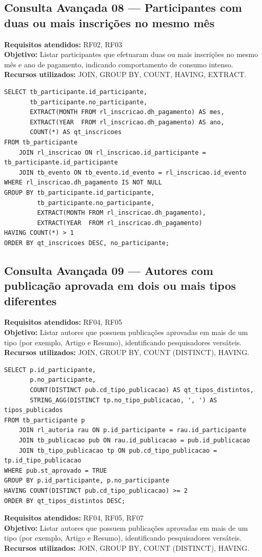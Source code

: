 \documentclass[12pt]{article}
\begin{document}
\subsection{Consulta Avançada 08 --- Participantes com duas ou mais inscrições no mesmo mês}
\textbf{Requisitos atendidos:} RF02, RF03 \\
\textbf{Objetivo:} Listar participantes que efetuaram duas ou mais inscrições no mesmo mês e ano de pagamento, indicando comportamento de consumo intenso. \\
\textbf{Recursos utilizados:} JOIN, GROUP BY, COUNT, HAVING, EXTRACT.
\begin{lstlisting}[caption={QA08 --- Participantes com duas ou mais inscrições no mesmo mês.}]
SELECT tb_participante.id_participante,
       tb_participante.no_participante,
       EXTRACT(MONTH FROM rl_inscricao.dh_pagamento) AS mes,
       EXTRACT(YEAR  FROM rl_inscricao.dh_pagamento) AS ano,
       COUNT(*) AS qt_inscricoes
FROM tb_participante
    JOIN rl_inscricao ON rl_inscricao.id_participante = tb_participante.id_participante
    JOIN tb_evento ON tb_evento.id_evento = rl_inscricao.id_evento
WHERE rl_inscricao.dh_pagamento IS NOT NULL
GROUP BY tb_participante.id_participante,
         tb_participante.no_participante,
         EXTRACT(MONTH FROM rl_inscricao.dh_pagamento),
         EXTRACT(YEAR  FROM rl_inscricao.dh_pagamento)
HAVING COUNT(*) > 1
ORDER BY qt_inscricoes DESC, no_participante;
\end{lstlisting}
\subsection{Consulta Avançada 09 --- Autores com publicação aprovada em dois ou mais tipos diferentes}
\textbf{Requisitos atendidos:} RF04, RF05 \\
\textbf{Objetivo:} Listar autores que possuem publicações aprovadas em mais de um tipo (por exemplo, Artigo e Resumo), identificando pesquisadores versáteis. \\
\textbf{Recursos utilizados:} JOIN, GROUP BY, COUNT (DISTINCT), HAVING.
\begin{lstlisting}[caption={QA09 --- Autores com publicação aprovada em dois ou mais tipos diferentes.}]
SELECT p.id_participante,
       p.no_participante,
       COUNT(DISTINCT pub.cd_tipo_publicacao) AS qt_tipos_distintos,
       STRING_AGG(DISTINCT tp.no_tipo_publicacao, ', ') AS tipos_publicados
FROM tb_participante p
    JOIN rl_autoria rau ON p.id_participante = rau.id_participante
    JOIN tb_publicacao pub ON rau.id_publicacao = pub.id_publicacao
    JOIN tb_tipo_publicacao tp ON pub.cd_tipo_publicacao = tp.id_tipo_publicacao
WHERE pub.st_aprovado = TRUE
GROUP BY p.id_participante, p.no_participante
HAVING COUNT(DISTINCT pub.cd_tipo_publicacao) >= 2
ORDER BY qt_tipos_distintos DESC;
\end{lstlisting}
\textbf{Requisitos atendidos:} RF04, RF05, RF07 \\
\textbf{Objetivo:} Listar autores que possuem publicações aprovadas em mais de um tipo (por exemplo, Artigo e Resumo), identificando pesquisadores versáteis. \\
\textbf{Recursos utilizados:} JOIN, GROUP BY, COUNT (DISTINCT), HAVING.
\end{document}
